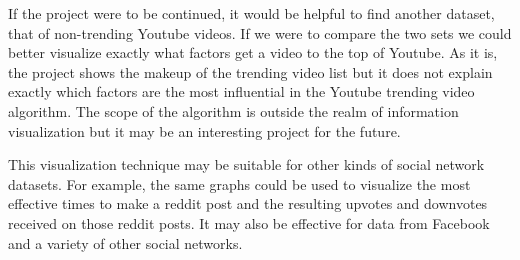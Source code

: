 \documentclass[journal]{vgtc}                %
\begin{document}
If the project were to be continued, it would be helpful to find another dataset, that of non-trending Youtube videos. If we were to compare the two sets we could better visualize exactly what factors get a video to the top of Youtube. As it is, the project shows the makeup of the trending video list but it does not explain exactly which factors are the most influential in the Youtube trending video algorithm. The scope of the algorithm is outside the realm of information visualization but it may be an interesting project for the future. 

This visualization technique may be suitable for other kinds of social network datasets. For example, the same graphs could be used to visualize the most effective times to make a reddit post and the resulting upvotes and downvotes received on those reddit posts. It may also be effective for data from Facebook and a variety of other social networks.  




\end{document}
